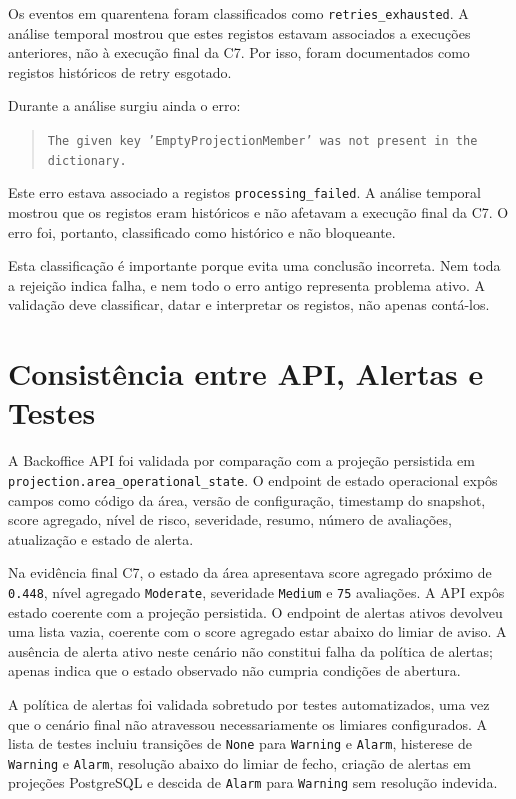 Os eventos em quarentena foram classificados como \texttt{retries\_exhausted}. A análise temporal mostrou que estes registos estavam associados a execuções anteriores, não à execução final da C7. Por isso, foram documentados como registos históricos de retry esgotado.

Durante a análise surgiu ainda o erro:

\begin{quote}
\texttt{The given key 'EmptyProjectionMember' was not present in the dictionary.}
\end{quote}

Este erro estava associado a registos \texttt{processing\_failed}. A análise temporal mostrou que os registos eram históricos e não afetavam a execução final da C7. O erro foi, portanto, classificado como histórico e não bloqueante.

Esta classificação é importante porque evita uma conclusão incorreta. Nem toda a rejeição indica falha, e nem todo o erro antigo representa problema ativo. A validação deve classificar, datar e interpretar os registos, não apenas contá-los.

\section{Consistência entre API, Alertas e Testes}

A Backoffice API foi validada por comparação com a projeção persistida em \texttt{projection.area\_operational\_state}. O endpoint de estado operacional expôs campos como código da área, versão de configuração, timestamp do snapshot, score agregado, nível de risco, severidade, resumo, número de avaliações, atualização e estado de alerta.

Na evidência final C7, o estado da área apresentava score agregado próximo de \texttt{0.448}, nível agregado \texttt{Moderate}, severidade \texttt{Medium} e \texttt{75} avaliações. A API expôs estado coerente com a projeção persistida. O endpoint de alertas ativos devolveu uma lista vazia, coerente com o score agregado estar abaixo do limiar de aviso. A ausência de alerta ativo neste cenário não constitui falha da política de alertas; apenas indica que o estado observado não cumpria condições de abertura.

A política de alertas foi validada sobretudo por testes automatizados, uma vez que o cenário final não atravessou necessariamente os limiares configurados. A lista de testes incluiu transições de \texttt{None} para \texttt{Warning} e \texttt{Alarm}, histerese de \texttt{Warning} e \texttt{Alarm}, resolução abaixo do limiar de fecho, criação de alertas em projeções PostgreSQL e descida de \texttt{Alarm} para \texttt{Warning} sem resolução indevida.

